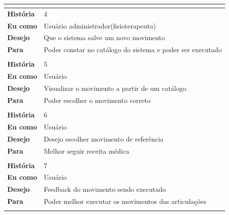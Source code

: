 \begin{table}[]
\begin{tabular}{|l|l|}
\multicolumn{2}{|l|}{}                                                       \\ \hline
\textbf{História} & 4                                                        \\ \hline
\textbf{Eu como}  & Usuário administrador(fisioterapeuta)                    \\ \hline
\textbf{Desejo}   & Que o sistema salve um novo movimento                    \\ \hline
\textbf{Para}     & Poder constar no catálogo do sistema e poder ser executado \\ \hline
\multicolumn{2}{|l|}{}                                                       \\ \hline
\textbf{História} & 5                                                        \\ \hline
\textbf{Eu como}  & Usuário                                                  \\ \hline
\textbf{Desejo}   & Visualizar o movimento a partir de um catálogo           \\ \hline
\textbf{Para}     & Poder escolher o movimento correto                       \\ \hline
\multicolumn{2}{|l|}{}                                                       \\ \hline

\textbf{História} & 6                                                        \\ \hline
\textbf{Eu como}  & Usuário                                                  \\ \hline
\textbf{Desejo}   & Desejo escolher movimento de referência                  \\ \hline
\textbf{Para}     & Melhor seguir receita médica                             \\ \hline
\multicolumn{2}{|l|}{}                                                       \\ \hline

\textbf{História} & 7                                                        \\ \hline
\textbf{Eu como}  & Usuário                                                  \\ \hline
\textbf{Desejo}   & Feedback do movimento sendo executado                    \\ \hline
\textbf{Para}     & Poder melhor executar os movimentos das articulações           \\ \hline
\multicolumn{2}{|l|}{}                                                       \\ \hline


\end{tabular}
\end{table}

